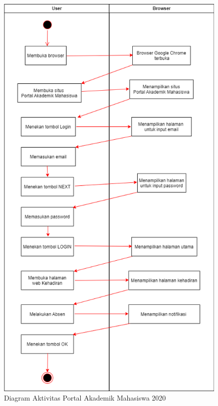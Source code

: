 \begin{figure}[H]
	\centering
	\includegraphics[scale=0.55]{Gambar/activityPAM.png}
	\caption{Diagram Aktivitas Portal Akademik Mahasiswa 2020} 
	\label{fig:acPAM}
\end{figure}

